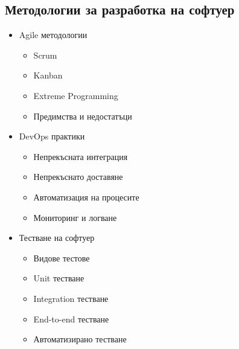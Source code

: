 \documentclass[12pt,a4paper]{article}
\begin{document}
\subsection{Методологии за разработка на софтуер}
\begin{itemize}
    \item Agile методологии
    \begin{itemize}
        \item Scrum
        \item Kanban
        \item Extreme Programming
        \item Предимства и недостатъци
    \end{itemize}
    
    \item DevOps практики
    \begin{itemize}
        \item Непрекъсната интеграция
        \item Непрекъснато доставяне
        \item Автоматизация на процесите
        \item Мониторинг и логване
    \end{itemize}
    
    \item Тестване на софтуер
    \begin{itemize}
        \item Видове тестове
        \item Unit тестване
        \item Integration тестване
        \item End-to-end тестване
        \item Автоматизирано тестване
    \end{itemize}
\end{itemize}
\end{document}
